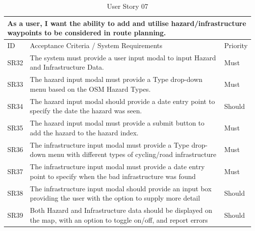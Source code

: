\begin{table}[!htb]
  \caption{User Story 07}
  \label{tab:user-story-07}
  \begin{tabular}{ m{1cm} m{11cm} m{1cm} }
  \hline
  \multicolumn{3}{p{13cm}}{As a user, I want the ability to add and utilise hazard/infrastructure waypoints to be considered in route planning.}\\ 
  \hline
  ID & Acceptance Criteria / System Requirements & Priority\\
  \hline
  \label{SR:32}SR32 & The system must provide a user input modal to input Hazard and Infrastructure Data. & Must \\
  \label{SR:33}SR33 & The hazard input modal must provide a Type drop-down menu based on the OSM Hazard Types. & Must\\
  \label{SR:34}SR34 & The hazard input modal should provide a date entry point to specify the date the hazard was seen. & Should\\
  \label{SR:35}SR35 & The hazard input modal must provide a submit button to add the hazard to the hazard index. & Must\\
  \label{SR:36}SR36 & The infrastructure input modal must provide a Type drop-down menu with different types of cycling/road infrastructure & Must\\
  \label{SR:37}SR37 & The infrastructure input modal must provide a date entry point to specify when the bad infrastructure was found & Must\\
  \label{SR:38}SR38 & The infrastructure input modal should provide an input box providing the user with the option to supply more detail & Should\\
  \label{SR:39}SR39 & Both Hazard and Infrastructure data should be displayed on the map, with an option to toggle on/off, and report errors & Should\\
  \hline
  \end{tabular}
\end{table}

